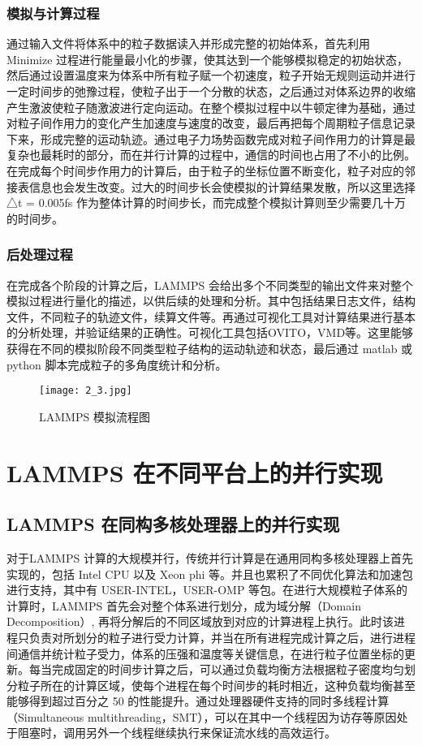 \subsubsection{模拟与计算过程}
通过输入文件将体系中的粒子数据读入并形成完整的初始体系，首先利用Minimize 过程进行能量最小化的步骤，使其达到一个能够模拟稳定的初始状态，然后通过设置温度来为体系中所有粒子赋一个初速度，粒子开始无规则运动并进行一定时间步的弛豫过程，使粒子出于一个分散的状态，之后通过对体系边界的收缩产生激波使粒子随激波进行定向运动。在整个模拟过程中以牛顿定律为基础，通过对粒子间作用力的变化产生加速度与速度的改变，最后再把每个周期粒子信息记录下来，形成完整的运动轨迹。通过电子力场势函数完成对粒子间作用力的计算是最复杂也最耗时的部分，而在并行计算的过程中，通信的时间也占用了不小的比例。在完成每个时间步作用力的计算后，由于粒子的坐标位置不断变化，粒子对应的邻接表信息也会发生改变。过大的时间步长会使模拟的计算结果发散，所以这里选择△t = 0.005fs 作为整体计算的时间步长，而完成整个模拟计算则至少需要几十万的时间步。

\subsubsection{后处理过程}
在完成各个阶段的计算之后，LAMMPS 会给出多个不同类型的输出文件来对整个模拟过程进行量化的描述，以供后续的处理和分析。其中包括结果日志文件，结构文件，不同粒子的轨迹文件，续算文件等。再通过可视化工具对计算结果进行基本的分析处理，并验证结果的正确性。可视化工具包括OVITO，VMD等。这里能够获得在不同的模拟阶段不同类型粒子结构的运动轨迹和状态，最后通过 matlab 或 python 脚本完成粒子的多角度统计和分析。

 \begin{figure}[h]
  \centering
  \texttt{[image: 2\_3.jpg]}
  \caption{LAMMPS 模拟流程图}
\end{figure}

\section{LAMMPS 在不同平台上的并行实现}
\subsection{LAMMPS 在同构多核处理器上的并行实现}
对于LAMMPS 计算的大规模并行，传统并行计算是在通用同构多核处理器上首先实现的，包括 Intel CPU 以及 Xeon phi 等。并且也累积了不同优化算法和加速包进行支持，其中有 USER-INTEL，USER-OMP 等包。在进行大规模粒子体系的计算时，LAMMPS 首先会对整个体系进行划分，成为域分解（Domain Decomposition）, 再将分解后的不同区域放到对应的计算进程上执行。此时该进程只负责对所划分的粒子进行受力计算，并当在所有进程完成计算之后，进行进程间通信并统计粒子受力，体系的压强和温度等关键信息，在进行粒子位置坐标的更新。每当完成固定的时间步计算之后，可以通过负载均衡方法根据粒子密度均匀划分粒子所在的计算区域，使每个进程在每个时间步的耗时相近，这种负载均衡甚至能够得到超过百分之 50 的性能提升。通过处理器硬件支持的同时多线程计算（Simultaneous multithreading，SMT），可以在其中一个线程因为访存等原因处于阻塞时，调用另外一个线程继续执行来保证流水线的高效运行。

